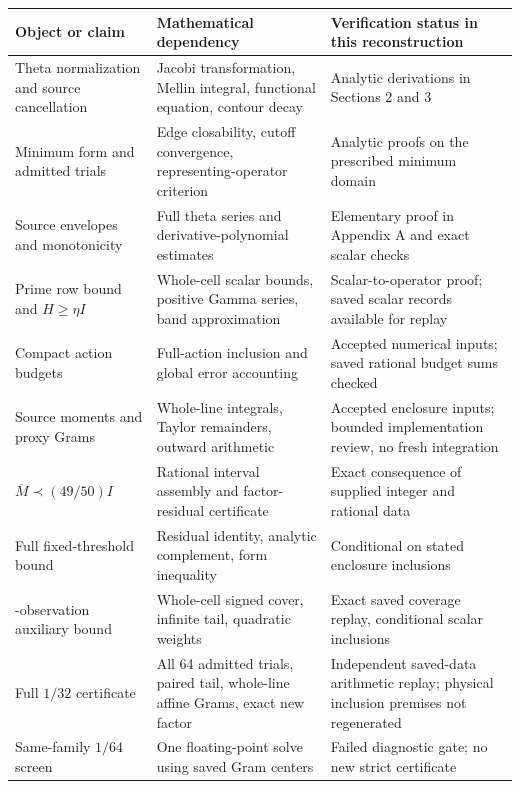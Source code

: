\documentclass[11pt,a4paper]{article}
\numberwithin{equation}{section}
\theoremstyle{definition}\newtheorem{definition}[theorem]{Definition}
\theoremstyle{remark}\newtheorem{remark}[theorem]{Remark}
\newcommand{\Mbar}{\overline M}
\begin{document}
\begingroup\small
\begin{longtable}{>{\raggedright\arraybackslash}p{.21\linewidth}>{\raggedright\arraybackslash}p{.34\linewidth}>{\raggedright\arraybackslash}p{.36\linewidth}}
\toprule
Object or claim&Mathematical dependency&Verification status in this reconstruction\\
\midrule
\endhead
Theta normalization and source cancellation&Jacobi transformation, Mellin integral, functional equation, contour decay&Analytic derivations in Sections 2 and 3\\
Minimum form and admitted trials&Edge closability, cutoff convergence, representing-operator criterion&Analytic proofs on the prescribed minimum domain\\
Source envelopes and monotonicity&Full theta series and derivative-polynomial estimates&Elementary proof in Appendix A and exact scalar checks\\
Prime row bound and $H\ge\eta I$&Whole-cell scalar bounds, positive Gamma series, band approximation&Scalar-to-operator proof; saved scalar records available for replay\\
Compact action budgets&Full-action inclusion and global error accounting&Accepted numerical inputs; saved rational budget sums checked\\
Source moments and proxy Grams&Whole-line integrals, Taylor remainders, outward arithmetic&Accepted enclosure inputs; bounded implementation review, no fresh integration\\
$\Mbar\prec(49/50)I$&Rational interval assembly and factor-residual certificate&Exact consequence of supplied integer and rational data\\
Full fixed-threshold bound&Residual identity, analytic complement, form inequality&Conditional on stated enclosure inclusions\\
372-observation auxiliary bound&Whole-cell signed cover, infinite tail, quadratic weights&Exact saved coverage replay, conditional scalar inclusions\\
Full $1/32$ certificate&All 64 admitted trials, paired tail, whole-line affine Grams, exact new factor&Independent saved-data arithmetic replay; physical inclusion premises not regenerated\\
Same-family $1/64$ screen&One floating-point solve using saved Gram centers&Failed diagnostic gate; no new strict certificate\\
\bottomrule
\end{longtable}
\endgroup
\end{document}
